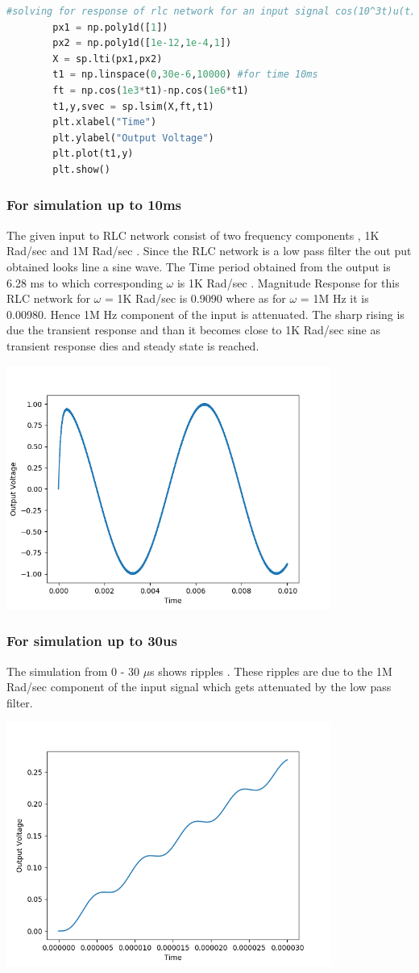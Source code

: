 \documentclass[a4paper]{article}
\begin{document}
\begin{lstlisting}[language=Python]
		#solving for response of rlc network for an input signal cos(10^3t)u(t) - cos(10^6t)u(t)
		px1 = np.poly1d([1])
		px2 = np.poly1d([1e-12,1e-4,1])
		X = sp.lti(px1,px2)
		t1 = np.linspace(0,30e-6,10000) #for time 10ms
		ft = np.cos(1e3*t1)-np.cos(1e6*t1)
		t1,y,svec = sp.lsim(X,ft,t1)
		plt.xlabel("Time")
		plt.ylabel("Output Voltage")
		plt.plot(t1,y)
		plt.show()
\end{lstlisting}
\subsubsection{For simulation up to 10ms}
The given input to RLC network consist of two frequency components , 1K Rad/sec and 1M Rad/sec . Since the RLC network is a low pass filter the out put obtained looks line a sine wave. The Time period obtained from the output is 6.28 ms to which corresponding $\omega$ is 1K Rad/sec . Magnitude Response for this RLC network for $\omega$ = 1K Rad/sec is 0.9090 where as for $\omega$ = 1M Hz it is 0.00980. Hence 1M Hz component of the input is attenuated. The sharp rising is due the transient response and than it becomes close to 1K Rad/sec sine as transient response dies and steady state is reached.
\begin{center}
\includegraphics[width=0.8\textwidth]{Figure_6.png}
\end{center}
\subsubsection{For simulation up to 30us}
The simulation from 0 - 30 $\mu$s shows ripples . These ripples are due to the 1M Rad/sec component of the input signal which gets attenuated by the low pass filter. 
\begin{center}
\includegraphics[width=0.8\textwidth]{Figure_6_b.png}
\end{center}
\end{document}

